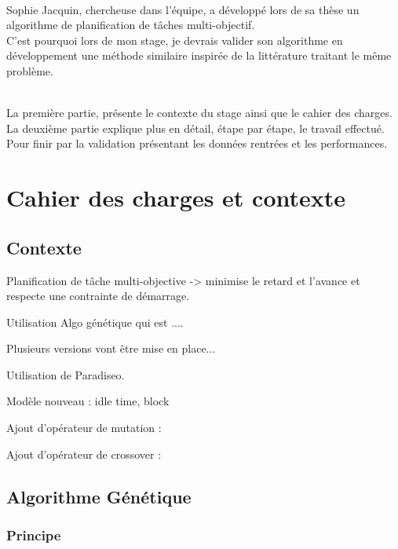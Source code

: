 \documentclass[a4paper,10pt]{report}
\begin{document}
      ~~\\
      
      Sophie Jacquin, chercheuse dans l'équipe, a développé lors de sa thèse un algorithme de planification de tâches multi-objectif.
      \\
      C'est pourquoi lors de mon stage, je devrais valider son algorithme en développement une méthode similaire inspirée de la littérature traitant le même problème.
      
      ~~\\

      La première partie, présente le contexte du stage ainsi que le cahier des charges. La  deuxième partie explique plus en détail, étape par étape, le travail effectué. Pour finir par la validation présentant les données rentrées et les performances.

      \newpage


  \chapter{Cahier des charges et contexte}

    \section{Contexte}
    
    Planification de tâche multi-objective -> minimise le retard et l'avance et respecte une contrainte de démarrage. 
    
    Utilisation Algo génétique qui est .... 
    
    Plusieurs versions vont être mise en place...
    
    Utilisation de Paradiseo.
    
    Modèle nouveau : idle time, block
    
    Ajout d'opérateur de mutation :
    
    Ajout d'opérateur de crossover : 
      
      
    \section{Algorithme Génétique}
	 
	 
	 \subsection{Principe}
	 
\end{document}

